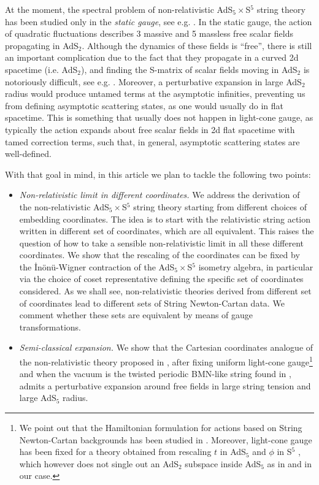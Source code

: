 \documentclass[12pt]{article}
\numberwithin{equation}{section}
\begin{document}
At the moment, the spectral problem of non-relativistic AdS$_5\times$S$^5$ string theory has been studied only in the \emph{static gauge}, see e.g. \cite{Sakaguchi:2007zsa,Sakaguchi:2007ba}. In the static gauge, the action of quadratic fluctuations describes 3 massive and 5 massless free scalar fields propagating in AdS$_2$.  Although the dynamics of these fields is ``free'', there is still an important complication due to the fact that they propagate in a curved 2d spacetime (i.e. AdS$_2$), and finding the S-matrix of scalar fields moving in AdS$_2$ is notoriously difficult,  see e.g.  \cite{Anninos:2019oka}. 
Moreover, a perturbative expansion in large AdS$_2$ radius would produce untamed terms at the asymptotic infinities, preventing us from defining asymptotic scattering states, as one would usually do in flat spacetime. This is something that usually does not happen in light-cone gauge, as typically the action expands about free scalar fields in 2d flat spacetime with tamed correction terms, such that, in general, asymptotic scattering states are well-defined.
 



 


With that goal in mind, in this article we plan to tackle the following two points:
\begin{itemize}
    \item  \emph{Non-relativistic limit in different coordinates.} 
We address the derivation of the non-relativistic AdS$_5\times$S$^5$ string theory starting from different choices of embedding coordinates. The idea is to start with the relativistic string action written in different set of coordinates, which are all equivalent. This raises the question of how to take a sensible non-relativistic limit in all these different coordinates. We show that the rescaling of the coordinates can be fixed by the \.In\"on\"u-Wigner contraction of the AdS$_5\times$S$^5$ isometry algebra, in particular via the choice of coset representative defining the specific set of coordinates considered. As we shall see, non-relativistic theories derived from different set of coordinates lead to different sets of String Newton-Cartan data. We comment whether these sets are equivalent by means of gauge transformations.


\item \emph{Semi-classical expansion.} 
We show that the Cartesian coordinates analogue of the non-relativistic theory proposed in \cite{Gomis:2005pg}, after fixing uniform light-cone gauge\footnote{We point out that the Hamiltonian formulation for actions based on String Newton-Cartan backgrounds has been studied in \cite{Kluson:2018grx}. Moreover, light-cone gauge has been fixed for a theory obtained from rescaling $t$ in AdS$_5$ and $\phi$ in S$^5$ \cite{Kluson:2017ufb}, which however does not single out an AdS$_2$ subspace inside AdS$_5$ as in \cite{Gomis:2005pg} and in our case.} and when the vacuum is the twisted periodic BMN-like string found in \cite{Fontanella:2021btt}, admits a perturbative expansion around free fields in large string tension and large AdS$_5$ radius.


\end{itemize}
\end{document}
